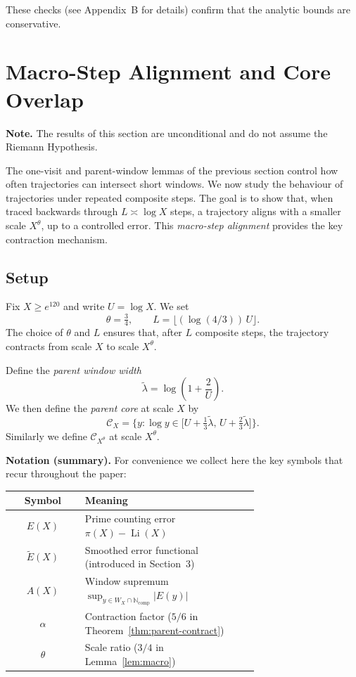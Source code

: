 \documentclass[11pt]{article}
\theoremstyle{plain}
\theoremstyle{definition}
\theoremstyle{remark}
\begin{document}
\noindent
These checks (see Appendix~B for details) confirm that the analytic bounds
are conservative.

\section{Macro-Step Alignment and Core Overlap}\label{sec:macro}

\noindent\textbf{Note.} The results of this section are unconditional and do not assume the Riemann Hypothesis.

The one-visit and parent-window lemmas of the previous section control how often trajectories can intersect short windows. We now study the behaviour of trajectories under repeated composite steps. The goal is to show that, when traced backwards through $L\asymp \log X$ steps, a trajectory aligns with a smaller scale $X^\theta$, up to a controlled error. This \emph{macro-step alignment} provides the key contraction mechanism.

\subsection{Setup}

Fix $X \geq e^{120}$ and write $U=\log X$. We set
\[
\theta = \tfrac{3}{4}, 
\qquad 
L = \big\lfloor (\log(4/3))\,U \big\rfloor.
\]
The choice of $\theta$ and $L$ ensures that, after $L$ composite steps, the trajectory contracts from scale $X$ to scale $X^\theta$.

Define the \emph{parent window width}
\[
\tilde\lambda = \log\!\left(1+\frac{2}{U}\right).
\]
We then define the \emph{parent core} at scale $X$ by
\[
\mathcal C_X = \Big\{ y : \log y \in \big[ U+\tfrac{1}{3}\tilde\lambda,\, U+\tfrac{2}{3}\tilde\lambda\big] \Big\}.
\]
Similarly we define $\mathcal C_{X^\theta}$ at scale $X^\theta$.

\medskip
\noindent\textbf{Notation (summary).} 
For convenience we collect here the key symbols that recur throughout the paper:

\begin{center}
\renewcommand{\arraystretch}{1.2}
\begin{tabular}{|c|p{0.7\linewidth}|}
\hline
Symbol & Meaning \\
\hline
$E(X)$ & Prime counting error $\pi(X)-\operatorname{Li}(X)$ \\
$\tilde E(X)$ & Smoothed error functional (introduced in Section~3) \\
$A(X)$ & Window supremum $\sup_{y\in W_X\cap\mathbb{N}_{\mathrm{comp}}} |E(y)|$ \\
$\alpha$ & Contraction factor ($5/6$ in Theorem~\ref{thm:parent-contract}) \\
$\theta$ & Scale ratio ($3/4$ in Lemma~\ref{lem:macro}) \\
\hline
\end{tabular}
\end{center}
\end{document}
